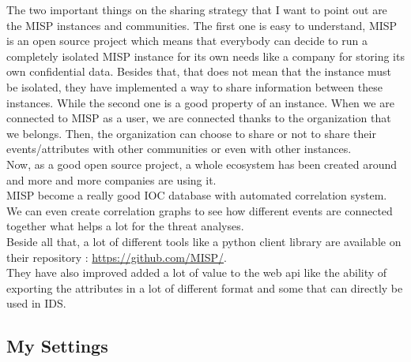 \documentclass{eplmastersthesis}
\begin{document}
The two important things on the sharing strategy that I want to point out are the MISP instances and communities. The first one is easy to understand, MISP is an open source project which means that everybody can decide to run a completely isolated MISP instance for its own needs like a company for storing its own confidential data. Besides that, that does not mean that the instance must be isolated, they have implemented a way to share information between these instances. While the second one is a good property of an instance. When we are connected to MISP as a user, we are connected thanks to the organization that we belongs. Then, the organization can choose to share or not to share their events/attributes with other communities or even with other instances. \\ 

Now, as a good open source project, a whole ecosystem has been created around and more and more companies are using it.\\
MISP become a really good IOC database with automated correlation system. We can even create correlation graphs to see how different events are connected together what helps a lot for the threat analyses.\\
Beside all that, a lot of different tools like a python client library are available on their repository : \url{https://github.com/MISP/}.\\
They have also improved added a lot of value to the web api like the ability of exporting the attributes in a lot of different format and some that can directly be used in IDS.\\

\subsection{My Settings}
\end{document}
